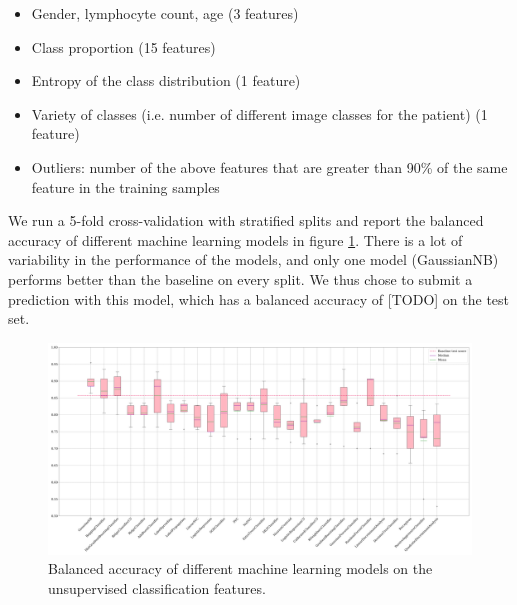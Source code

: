 \documentclass{midl}
\begin{document}
\begin{itemize}
    \setlength\itemsep{0em}
    \item Gender, lymphocyte count, age (3 features)
    \item Class proportion (15 features)
    \item Entropy of the class distribution (1 feature)
    \item Variety of classes (i.e. number of different image classes for the patient) (1 feature)
    \item Outliers: number of the above features that are greater than 90\% of the same feature in the training samples
\end{itemize}

We run a 5-fold cross-validation with stratified splits and report the balanced accuracy of different machine learning models in figure \ref{fig:unsupervised_classification_models}. There is a lot of variability in the performance of the models, and only one model (GaussianNB) performs better than the baseline on every split. We thus chose to submit a prediction with this model, which has a balanced accuracy of [TODO] on the test set.

\begin{figure}[h]
    \centering
    \includegraphics[width=\textwidth]{figures/unsupervised_classification_models.png}
    \caption{Balanced accuracy of different machine learning models on the unsupervised classification features.}
    \label{fig:unsupervised_classification_models}
\end{figure}
\end{document}
